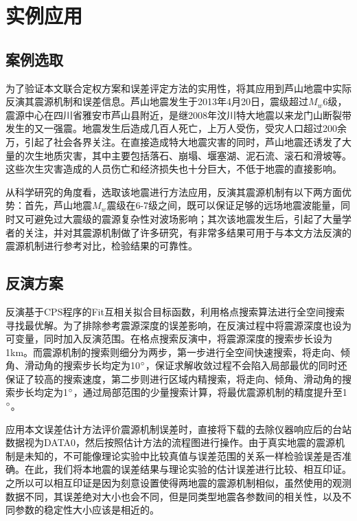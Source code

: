 

\chapter{实例应用}

\section{案例选取}

为了验证本文联合定权方案和误差评定方法的实用性，将其应用到芦山地震中实际反演其震源机制和误差信息。芦山地震发生于2013年4月20日，震级超过$M_w$6级，震源中心在四川省雅安市芦山县附近，是继2008年汶川特大地震以来龙门山断裂带发生的又一强震。地震发生后造成几百人死亡，上万人受伤，受灾人口超过200余万\citep{cuipeng2013}，引起了社会各界关注。在直接造成特大地震灾害的同时，芦山地震还诱发了大量的次生地质灾害，其中主要包括落石、崩塌、堰塞湖、泥石流、滚石和滑坡等\citep{chenxiaoqing2013}。这些次生灾害造成的人员伤亡和经济损失也十分巨大，不低于地震的直接影响。

从科学研究的角度看，选取该地震进行方法应用，反演其震源机制有以下两方面优势：首先，芦山地震$M_w$震级在6-7级之间，既可以保证足够的远场地震波能量，同时又可避免过大震级的震源复杂性对波场影响；其次该地震发生后，引起了大量学者的关注，并对其震源机制做了许多研究，有非常多结果可用于与本文方法反演的震源机制进行参考对比，检验结果的可靠性。

\section{反演方案}
反演基于CPS程序的Fit互相关拟合目标函数，利用格点搜索算法进行全空间搜索寻找最优解。为了排除参考震源深度的误差影响，在反演过程中将震源深度也设为可变量，同时加入反演范围。在格点搜索反演中，将震源深度的搜索步长设为1km。而震源机制的搜索则细分为两步，第一步进行全空间快速搜索，将走向、倾角、滑动角的搜索步长均定为10$^\circ$，保证求解收敛过程不会陷入局部最优的同时还保证了较高的搜索速度，第二步则进行区域内精搜索，将走向、倾角、滑动角的搜索步长均定为1$^\circ$，通过局部范围的少量搜索计算，将最优震源机制的精度提升至1$^\circ$。

应用本文误差估计方法评价震源机制误差时，直接将下载的去除仪器响应后的台站数据视为DATA0，然后按照估计方法的流程图进行操作。由于真实地震的震源机制是未知的，不可能像理论实验中比较真值与误差范围的关系一样检验误差是否准确。在此，我们将本地震的误差结果与理论实验的估计误差进行比较、相互印证。之所以可以相互印证是因为刻意设置使得两地震的震源机制相似，虽然使用的观测数据不同，其误差绝对大小也会不同，但是同类型地震各参数间的相关性，以及不同参数的稳定性大小应该是相近的。

